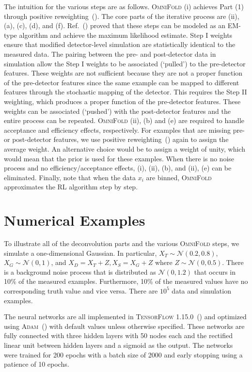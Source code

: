 \documentclass{article} %
\begin{document}
The intuition for the various steps are as follows.  \textsc{OmniFold} (i) achieves Part (1) through positive reweighting~(\cite{Nachman:2020fff}).  The core parts of the iterative process are (ii), (a), (c), (d), and (f).  Ref.~(\cite{Andreassen:2019cjw}) proved that these steps can be modeled as an EM-type algorithm and achieve the maximum likelihood estimate.  Step I weights ensure that modified detector-level simulation are statistically identical to the measured data.  The pairing between the pre- and post-detector data in simulation allow the Step I weights to be associated (`pulled') to the pre-detector features.  These weights are not sufficient because they are not a proper function of the pre-detector features since the same example can be mapped to different features through the stochastic mapping of the detector.  This requires the Step II weighting, which produces a proper function of the pre-detector features.  These weights can be associated (`pushed') with the post-detector features and the entire process can be repeated.  \textsc{OmniFold} (ii), (b) and (e) are required to handle acceptance and efficiency effects, respectively.  For examples that are missing pre- or post-detector features, we use positive reweighting~(\cite{Nachman:2020fff}) again to assign the average weight. An alternative choice would be to assign a weight of unity, which would mean that the prior is used for these examples.  When there is no noise process and no efficiency/acceptance effects, (i), (ii), (b), and (ii), (e) can be eliminated.  Finally, note that when the data $x_i$ are binned, \textsc{OmniFold} approximates the RL algorithm step by step.

\section{Numerical Examples}
\label{sec:examples}

To illustrate all of the deconvolution parts and the various \textsc{OmniFold} steps, we simulate a one-dimensional Gaussian.  In particular, $X_T\sim\mathcal{N}(0.2,0.8)$, $X_G\sim\mathcal{N}(0,1)$, and $X_D=X_T+Z, X_S=X_G+Z$ where $Z\sim\mathcal{N}(0,0.5)$.  There is a background noise process that is distributed as $\mathcal{N}(0,1.2)$ that occurs in 10\% of the measured examples.  Furthermore, 10\% of the measured values have no corresponding truth value and vice versa.  There are $10^5$ data and simulation examples.

The neural networks are all implemented in \textsc{TensorFlow} 1.15.0~(\cite{tensorflow}) and optimized using \textsc{Adam}~(\cite{adam}) with default values unless otherwise specified.  These networks are fully connected with three hidden layers with 50 nodes each and the rectified linear unit between hidden layers and a sigmoid as the output.  The networks were trained for 200 epochs with a batch size of 2000 and early stopping using a patience of 10 epochs.
\end{document}
